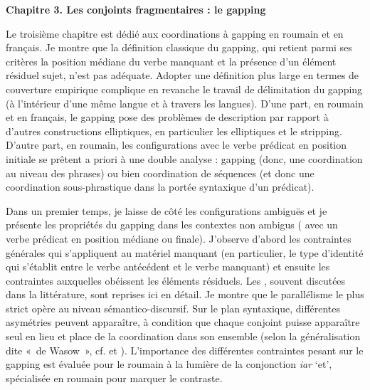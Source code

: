 \textbf{Chapitre 3. Les conjoints fragmentaires : le gapping} 


Le troisième chapitre est dédié aux coordinations à gapping en roumain et en français. Je montre que la définition classique du gapping, qui retient parmi ses critères la position médiane du verbe manquant et la présence d’un élément résiduel sujet, n’est pas adéquate. Adopter une définition plus large en termes de couverture empirique complique en revanche le travail de délimitation du gapping (à l’intérieur d’une même langue et à travers les langues). D’une part, en roumain et en français, le gapping pose des problèmes de description par rapport à d’autres constructions elliptiques, en particulier les  elliptiques et le stripping. D’autre part, en roumain, les configurations avec le verbe prédicat en position initiale se prêtent a priori à une double analyse : gapping (donc, une coordination au niveau des phrases) ou bien coordination de séquences (et donc une coordination sous-phrastique dans la portée syntaxique d’un prédicat). 



Dans un premier temps, je laisse de côté les configurations ambiguës et je présente les propriétés du gapping dans les contextes non ambigus ({\cad} avec un verbe prédicat en position médiane ou finale). J’observe d’abord les contraintes générales qui s’appliquent au matériel manquant (en particulier, le type d’identité qui s’établit entre le verbe antécédent et le verbe manquant) et ensuite les contraintes auxquelles obéissent les éléments résiduels. Les , souvent discutées dans la littérature, sont reprises ici en détail. Je montre que le parallélisme le plus strict opère au niveau sémantico-discursif. Sur le plan syntaxique, différentes asymétries peuvent apparaître, à condition que chaque conjoint puisse apparaître seul en lieu et place de la coordination dans son ensemble (selon la généralisation dite «~de Wasow~», cf. \citealt{GazdarEtAl1985} et \citealt{PullumEtAl1986}). L’importance des différentes contraintes pesant sur le gapping est évaluée pour le roumain à la lumière de la conjonction \textit{iar} ‘et’, spécialisée en roumain pour marquer le contraste.



